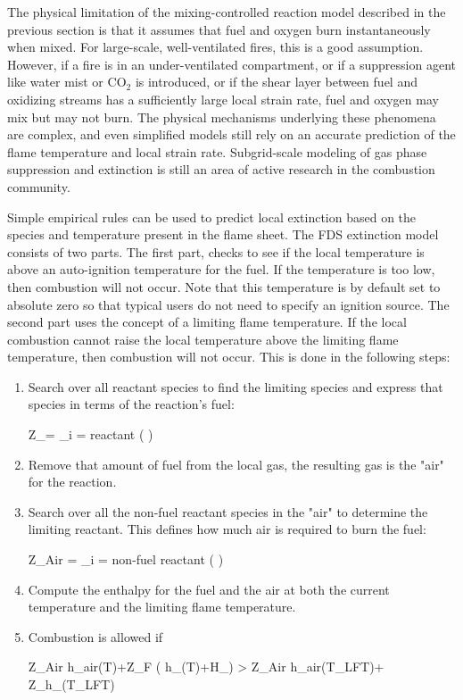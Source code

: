 \label{extinction}

The physical limitation of the mixing-controlled reaction model described in the previous section is that it assumes that fuel and oxygen burn instantaneously when mixed. For large-scale, well-ventilated
fires, this is a good assumption. However, if a fire is in an
under-ventilated compartment, or if a suppression agent like water
mist or CO$_2$ is introduced, or if the shear layer between fuel and oxidizing streams
has a sufficiently large local strain rate,
fuel and oxygen may mix but may not burn.
The physical mechanisms underlying these phenomena are complex, and
even simplified models still rely on an accurate prediction
of the flame temperature and local strain rate.
Subgrid-scale modeling of gas phase suppression and
extinction is still an area of active research in the combustion
community.

Simple empirical rules can be used to predict local
extinction based on the species and temperature present in the flame sheet.  The FDS extinction model consists of two parts. The first part, checks to see if the local temperature is above an auto-ignition temperature for the fuel.  If the temperature is too low, then combustion will not occur.  Note that this temperature is by default set to absolute zero so that typical users do not need to specify an ignition source.  The second part uses the concept of a limiting flame temperature.  If the local combustion cannot raise the local temperature above the limiting flame temperature, then combustion will not occur.  This is done in the following steps:

\begin{enumerate}
\item Search over all reactant species to find the limiting species and express that species in terms of the reaction's fuel:

\be \Delta Z_\F = \min_{i \; = \; reactant} \left( \right) \ee
\item Remove that amount of fuel from the local gas, the resulting gas is the "air" for the reaction.
\item Search over all the non-fuel reactant species in the "air" to determine the limiting reactant.  This defines how much air is required to burn the fuel:

\be \Delta Z_{Air} = \min_{i \; = \; non-fuel \; reactant} \left( \right) \ee

\item Compute the enthalpy for the fuel and the air at both the current temperature and the limiting flame temperature.
\item Combustion is allowed if 

\be \Delta Z_{Air} h_{air}(T)+\Delta Z_F \left( h_\F(T)+\Delta H_\F \right) > \Delta Z_{Air} h_{air}(T_{LFT})+ \Delta Z_\F h_\F(T_{LFT}) \ee

\end{enumerate}

